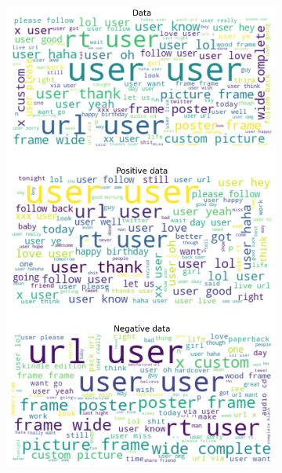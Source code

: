 \documentclass{article}
\begin{document}
\begin{itemize}
\begin{figure}[H]
\begin{subfigure}[b]{0.24\textwidth}
\includegraphics[width=\textwidth]{chapter-06/section-01-01/04/visualization/3/wordcloud.png}
\end{subfigure}
\begin{subfigure}[b]{0.24\textwidth}
\centering

\end{subfigure}
\end{figure}
\end{itemize}
\end{document}
